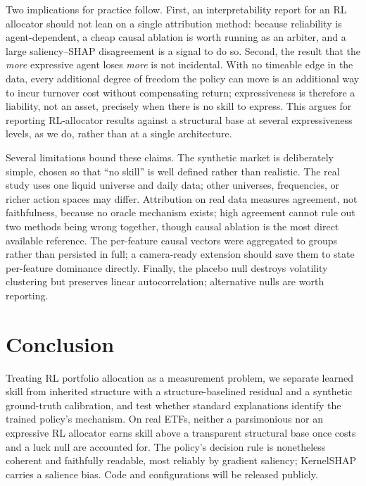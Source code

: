 \documentclass[sigconf,anonymous,review]{acmart}
\begin{document}
Two implications for practice follow. First, an interpretability report for an RL
allocator should not lean on a single attribution method: because reliability is
agent-dependent, a cheap causal ablation is worth running as an arbiter, and a large
saliency--SHAP disagreement is a signal to do so. Second, the result that the
\emph{more} expressive agent loses \emph{more} is not incidental. With no timeable
edge in the data, every additional degree of freedom the policy can move is an
additional way to incur turnover cost without compensating return; expressiveness is
therefore a liability, not an asset, precisely when there is no skill to express. This
argues for reporting RL-allocator results against a structural base at several
expressiveness levels, as we do, rather than at a single architecture.

Several limitations bound these claims. The synthetic market is deliberately simple,
chosen so that ``no skill'' is well defined rather than realistic. The real study uses
one liquid universe and daily data; other universes, frequencies, or richer action
spaces may differ. Attribution on real data measures agreement, not faithfulness,
because no oracle mechanism exists; high agreement cannot rule out two methods being
wrong together, though causal ablation is the most direct available reference. The
per-feature causal vectors were aggregated to groups rather than persisted in full; a
camera-ready extension should save them to state per-feature dominance directly.
Finally, the placebo null destroys volatility clustering but preserves linear
autocorrelation; alternative nulls are worth reporting.

\section{Conclusion}
Treating RL portfolio allocation as a measurement problem, we separate learned skill
from inherited structure with a structure-baselined residual and a synthetic
ground-truth calibration, and test whether standard explanations identify the trained
policy's mechanism. On real ETFs, neither a parsimonious nor an expressive RL
allocator earns skill above a transparent structural base once costs and a luck null
are accounted for. The policy's decision rule is nonetheless coherent and faithfully
readable, most reliably by gradient saliency; KernelSHAP carries a salience bias.
Code and configurations will be released publicly.



\end{document}
